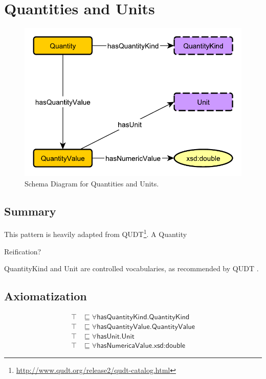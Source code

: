 \section{Quantities and Units}
\label{sec:Quantities}
\begin{figure}[h!]
\begin{center}
\includegraphics[width=.7\textwidth]{figures/quantities}
\end{center}
\caption{Schema Diagram for Quantities and Units.}
\label{fig:Quantities}
\end{figure}
\subsection{Summary}
\label{sum:Quantities}
This pattern is heavily adapted from QUDT\footnote{\url{http://www.qudt.org/release2/qudt-catalog.html}}. A \textsf{Quantity} 

Reification?

\textsf{QuantityKind} and \textsf{Unit} are controlled vocabularies, as recommended by QUDT \cite{qudt}.

\subsection{Axiomatization}
\label{axs:Quantities}
\begin{align}
\top &\sqsubseteq \forall \textsf{hasQuantityKind.QuantityKind} \\
\top &\sqsubseteq \forall \textsf{hasQuantityValue.QuantityValue} \\
\top &\sqsubseteq \forall \textsf{hasUnit.Unit} \\
\top &\sqsubseteq \forall \textsf{hasNumericaValue.xsd:double}
\end{align}

